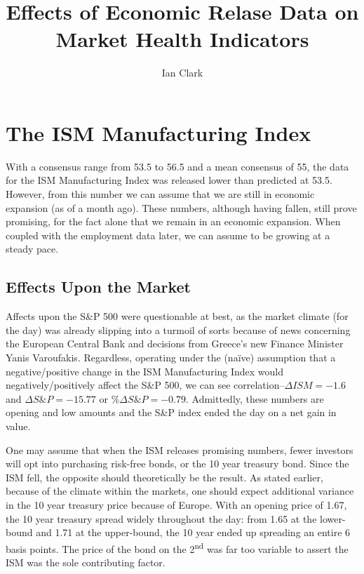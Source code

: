 \documentclass[11pt,letterpaper,english]{article}
\title{Effects of Economic Relase Data on Market Health Indicators}
\author{Ian Clark}
\date{}
\begin{document}
\maketitle

\section{The ISM Manufacturing Index}
With a consensus range from 53.5 to 56.5 and a mean consensus of 55, the data for the ISM Manufacturing Index was released lower than predicted at 53.5. However, from this number we can assume that we are still in economic expansion (as of a month ago). These numbers, although having fallen, still prove promising, for the fact alone that we remain in an economic expansion. When coupled with the employment data later, we can assume to be growing at a steady pace.

\subsection{Effects Upon the Market}
Affects upon the S\&P 500 were questionable at best, as the market climate (for the day) was already slipping into a turmoil of sorts because of news concerning the European Central Bank and decisions from Greece's new Finance Minister Yanis Varoufakis. Regardless, operating under the (naïve) assumption that a negative/positive change in the ISM Manufacturing Index would negatively/positively affect the S\&P 500, we can see correlation--$\Delta{ISM} = -1.6$ and $\Delta{S\&P} = -15.77$ or $\%\Delta{S\&P} = -0.79$. Admittedly, these numbers are opening and low amounts and the S\&P index ended the day on a net gain in value.

\vspace{5mm}

\noindent One may assume that when the ISM releases promising numbers, fewer investors will opt into purchasing risk-free bonds, or the 10 year treasury bond. Since the ISM fell, the opposite should theoretically be the result. As stated earlier, because of the climate within the markets, one should expect additional variance in the 10 year treasury price because of Europe. With an opening price of 1.67, the 10 year treasury spread widely throughout the day: from 1.65 at the lower-bound and 1.71 at the upper-bound, the 10 year ended up spreading an entire 6 basis points. The price of the bond on the 2\textsuperscript{nd} was far too variable to assert the ISM was the sole contributing factor.
\end{document}
